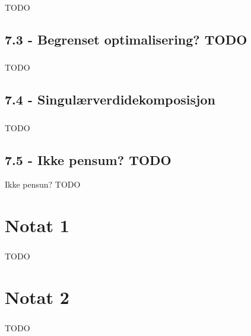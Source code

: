 \documentclass{article}
\begin{document}
      \subsubsection{}
        TODO
    \subsection{7.3 - Begrenset optimalisering? TODO}
      \subsubsection{}
        TODO
    \subsection{7.4 - Singulærverdidekomposisjon}
      \subsubsection{}
        TODO
    \subsection{7.5 - Ikke pensum? TODO}
      Ikke pensun? TODO
  \section{Notat 1}
    \subsubsection{}
      TODO
  \section{Notat 2}
    \subsubsection{}
      TODO
\end{document}
